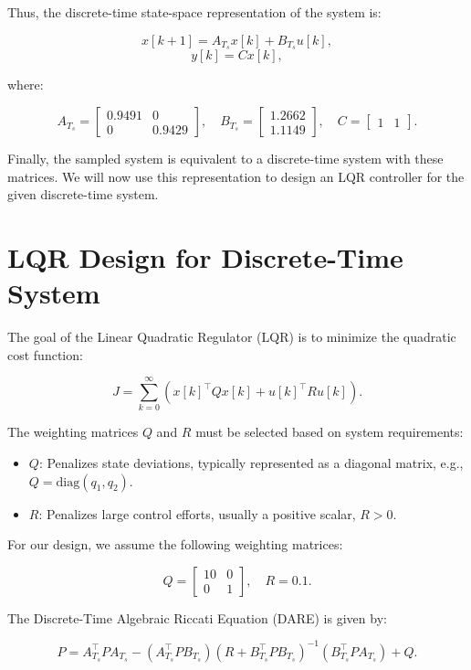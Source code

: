 Thus, the discrete-time state-space representation of the system is:

\[
x[k+1] = A_{T_s} x[k] + B_{T_s} u[k],
\]
\[
y[k] = C x[k],
\]

where:

\[
A_{T_s} = 
\begin{bmatrix}
0.9491 & 0 \\
0 & 0.9429
\end{bmatrix}, \quad
B_{T_s} = 
\begin{bmatrix}
1.2662 \\
1.1149
\end{bmatrix}, \quad
C = 
\begin{bmatrix}
1 & 1
\end{bmatrix}.
\]

Finally, the sampled system is equivalent to a discrete-time system with these matrices. We will now use this representation to design an LQR controller for the given discrete-time system.

\section{LQR Design for Discrete-Time System}

The goal of the Linear Quadratic Regulator (LQR) is to minimize the quadratic cost function:

\[
J = \sum_{k=0}^\infty \left( x[k]^\top Q x[k] + u[k]^\top R u[k] \right).
\]

The weighting matrices \( Q \) and \( R \) must be selected based on system requirements:

\begin{itemize}
    \item \( Q \): Penalizes state deviations, typically represented as a diagonal matrix, e.g., \( Q = \text{diag}(q_1, q_2) \).
    \item \( R \): Penalizes large control efforts, usually a positive scalar, \( R > 0 \).
\end{itemize}

For our design, we assume the following weighting matrices:

\[
Q = \begin{bmatrix}
10 & 0 \\
0 & 1
\end{bmatrix}, \quad R = 0.1.
\]

The Discrete-Time Algebraic Riccati Equation (DARE) is given by:

\[
P = A_{T_s}^\top P A_{T_s} - \left(A_{T_s}^\top P B_{T_s} \right) 
\left(R + B_{T_s}^\top P B_{T_s} \right)^{-1} 
\left(B_{T_s}^\top P A_{T_s} \right) + Q.
\]

